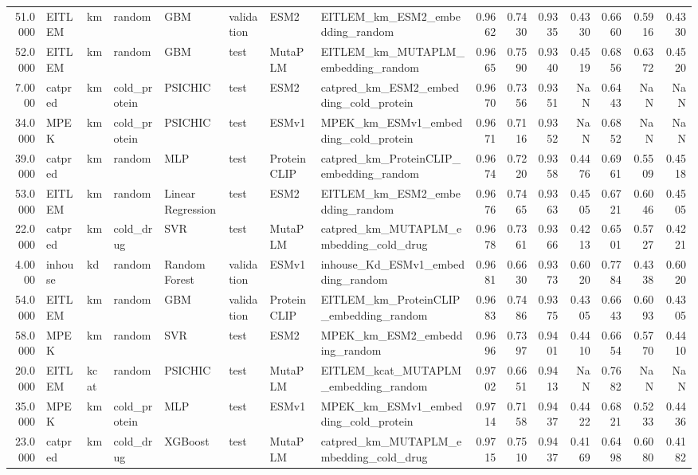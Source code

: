 \begin{tabular}{rlllllllrrrrrrr}
51.0000 & EITLEM & km & random & GBM & validation & ESM2 & EITLEM_km_ESM2_embedding_random & 0.9662 & 0.7430 & 0.9335 & 0.4330 & 0.6660 & 0.5916 & 0.4330 \\
52.0000 & EITLEM & km & random & GBM & test & MutaPLM & EITLEM_km_MUTAPLM_embedding_random & 0.9665 & 0.7590 & 0.9340 & 0.4519 & 0.6856 & 0.6372 & 0.4520 \\
7.0000 & catpred & km & cold_protein & PSICHIC & test & ESM2 & catpred_km_ESM2_embedding_cold_protein & 0.9670 & 0.7356 & 0.9351 & NaN & 0.6443 & NaN & NaN \\
34.0000 & MPEK & km & cold_protein & PSICHIC & test & ESMv1 & MPEK_km_ESMv1_embedding_cold_protein & 0.9671 & 0.7116 & 0.9352 & NaN & 0.6852 & NaN & NaN \\
39.0000 & catpred & km & random & MLP & test & ProteinCLIP & catpred_km_ProteinCLIP_embedding_random & 0.9674 & 0.7220 & 0.9358 & 0.4476 & 0.6961 & 0.5509 & 0.4518 \\
53.0000 & EITLEM & km & random & Linear Regression & test & ESM2 & EITLEM_km_ESM2_embedding_random & 0.9676 & 0.7465 & 0.9363 & 0.4505 & 0.6721 & 0.6046 & 0.4505 \\
22.0000 & catpred & km & cold_drug & SVR & test & MutaPLM & catpred_km_MUTAPLM_embedding_cold_drug & 0.9678 & 0.7361 & 0.9366 & 0.4213 & 0.6501 & 0.5727 & 0.4221 \\
4.0000 & inhouse & kd & random & Random Forest & validation & ESMv1 & inhouse_Kd_ESMv1_embedding_random & 0.9681 & 0.6630 & 0.9373 & 0.6020 & 0.7784 & 0.4338 & 0.6020 \\
54.0000 & EITLEM & km & random & GBM & validation & ProteinCLIP & EITLEM_km_ProteinCLIP_embedding_random & 0.9683 & 0.7486 & 0.9375 & 0.4305 & 0.6643 & 0.6093 & 0.4305 \\
58.0000 & MPEK & km & random & SVR & test & ESM2 & MPEK_km_ESM2_embedding_random & 0.9696 & 0.7397 & 0.9401 & 0.4410 & 0.6654 & 0.5770 & 0.4410 \\
20.0000 & EITLEM & kcat & random & PSICHIC & test & MutaPLM & EITLEM_kcat_MUTAPLM_embedding_random & 0.9702 & 0.6651 & 0.9413 & NaN & 0.7682 & NaN & NaN \\
35.0000 & MPEK & km & cold_protein & MLP & test & ESMv1 & MPEK_km_ESMv1_embedding_cold_protein & 0.9714 & 0.7158 & 0.9437 & 0.4422 & 0.6821 & 0.5233 & 0.4436 \\
23.0000 & catpred & km & cold_drug & XGBoost & test & MutaPLM & catpred_km_MUTAPLM_embedding_cold_drug & 0.9715 & 0.7510 & 0.9437 & 0.4169 & 0.6498 & 0.6080 & 0.4182 \\

\end{tabular}
